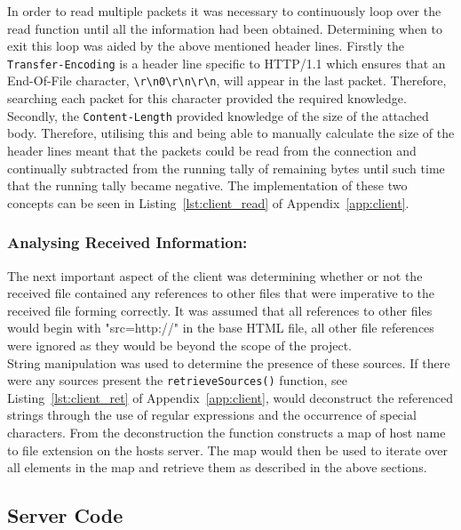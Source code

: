 \documentclass[10pt,twocolumn]{witseiepaper}
\begin{document}
		In order to read multiple packets it was necessary to continuously loop over the read function until all the information had been obtained. Determining when to exit this loop was aided by the above mentioned header lines. Firstly the \texttt{Transfer-Encoding} is a header line specific to HTTP/1.1 which ensures that an End-Of-File character, \texttt{\textbackslash r\textbackslash n0\textbackslash r\textbackslash n\textbackslash r\textbackslash n}, will appear in the last packet. Therefore, searching each packet for this character provided the required knowledge. Secondly, the \texttt{Content-Length} provided knowledge of the size of the attached body. Therefore, utilising this and being able to manually calculate the size of the header lines meant that the packets could be read from the connection and continually subtracted from the running tally of remaining bytes until such time that the running tally became negative. The implementation of these two concepts can be seen in Listing~\ref{lst:client_read} of Appendix~\ref{app:client}. 
		
		\subsubsection*{Analysing Received Information:} The next important aspect of the client was determining whether or not the received file contained any references to other files that were imperative to the received file forming correctly. It was assumed that all references to other files would begin with "src=http://" in the base HTML file, all other file references were ignored as they would be beyond the scope of the project.\\
		
		String manipulation was used to determine the presence of these sources. If there were any sources present the \texttt{retrieveSources()} function, see Listing~\ref{lst:client_ret} of Appendix~\ref{app:client}, would deconstruct the referenced strings through the use of regular expressions and the occurrence of special characters. From the deconstruction the function constructs a map of host name to file extension on the hosts server. The map would then be used to iterate over all elements in the map and retrieve them as described in the above sections.
				
	\subsection{Server Code}
	
\end{document}
